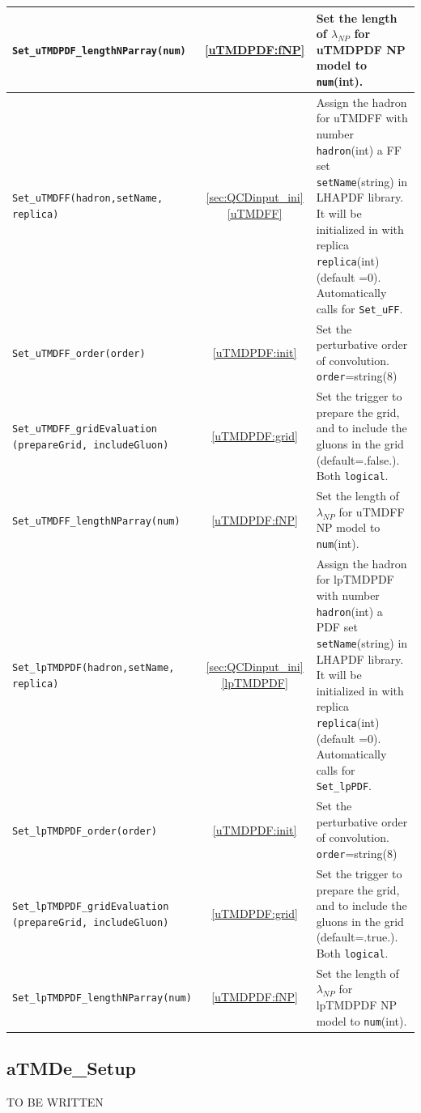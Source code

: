 \documentclass[prd,nofootinbib,eqsecnum,final]{revtex4}
\renewcommand{\(}{\left(}
\renewcommand{\)}{\right)}
\renewcommand{\[}{\left[}
\renewcommand{\]}{\right]}
\newcommand{\red}[1]{{\color[rgb]{1,0,0} #1}}
\newcommand{\blue}[1]{{\color{blue} #1}}
\begin{document}
\begin{center}
\begin{longtable}{||p{7cm}|c|p{10cm}||}
\\\hline
\texttt{Set\_uTMDPDF\_lengthNParray(num)} & \ref{uTMDPDF:fNP} & Set the length of $\lambda_{NP}$ for uTMDPDF NP model to \texttt{num}(int).
\\\hline\hline
\texttt{Set\_uTMDFF(hadron,setName,\blue{replica}) } & \ref{sec:QCDinput_ini} \ref{uTMDFF}& Assign the hadron for uTMDFF with number \texttt{hadron}(int) a FF set \texttt{setName}(string) in LHAPDF library. It will be initialized in with replica \texttt{replica}(int)(default =0). Automatically calls for \texttt{Set\_uFF}.
\\\hline
\texttt{Set\_uTMDFF\_order(order)} &\ref{uTMDPDF:init} & Set the perturbative order of convolution. \texttt{order}=string(8)
\\\hline
\texttt{Set\_uTMDFF\_gridEvaluation} \texttt{(prepareGrid,\blue{includeGluon})} & \ref{uTMDPDF:grid} & Set the trigger to prepare the grid, and to include the gluons in the grid (default=.false.). Both \texttt{logical}.
\\\hline
\texttt{Set\_uTMDFF\_lengthNParray(num)} & \ref{uTMDPDF:fNP} & Set the length of $\lambda_{NP}$ for uTMDFF NP model to \texttt{num}(int).
\\\hline\hline
\texttt{Set\_lpTMDPDF(hadron,setName,\blue{replica}) } & \ref{sec:QCDinput_ini} \ref{lpTMDPDF} & Assign the hadron for lpTMDPDF with number \texttt{hadron}(int) a PDF set \texttt{setName}(string) in LHAPDF library. It will be initialized in with replica \texttt{replica}(int)(default =0). Automatically calls for \texttt{Set\_lpPDF}.
\\\hline
\texttt{Set\_lpTMDPDF\_order(order)} &\ref{uTMDPDF:init} & Set the perturbative order of convolution. \texttt{order}=string(8)
\\\hline
\texttt{Set\_lpTMDPDF\_gridEvaluation} \texttt{(prepareGrid,\blue{includeGluon})} & \ref{uTMDPDF:grid} & Set the trigger to prepare the grid, and to include the gluons in the grid (default=.true.). Both \texttt{logical}.
\\\hline
\texttt{Set\_lpTMDPDF\_lengthNParray(num)} & \ref{uTMDPDF:fNP} & Set the length of $\lambda_{NP}$ for lpTMDPDF NP model to \texttt{num}(int).
\end{longtable}
\end{center}

\subsection{aTMDe\_Setup}
\label{sec:aTMDe_Setup}
\red{TO BE WRITTEN}
\end{document}
